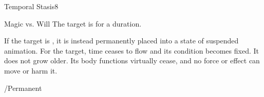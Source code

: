 \begin{spellsection}{Temporal Stasis}{8}
\begin{spellheader}
    \begin{spelltargetinginfo}
    \end{spelltargetinginfo}
\end{spellheader}
\begin{spellcontent}
    \begin{spelleffects}
        \begin{spellattack}{Magic vs. Will}
            \spellsuccess The target is \slowed for a \durlong duration.

            If the target is \bloodied, it is instead permanently placed into a state of suspended animation. For the target, time ceases to flow and its condition becomes fixed. It does not grow older. Its body functions virtually cease, and no force or effect can move or harm it.
        \end{spellattack}
        \spelldur \durlong/Permanent
    \end{spelleffects}
\end{spellcontent}
\begin{spellfooter}
\end{spellfooter}
\end{spellsection}

